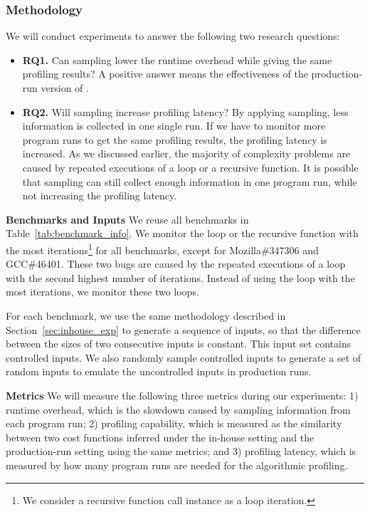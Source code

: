 \subsubsection{Methodology}
We will conduct experiments to answer the following two research questions:

\begin{itemize}
\item {\bf RQ1.} 
Can sampling lower the runtime overhead while giving the same profiling results? 
A positive answer means the effectiveness of the production-run version of \Tool. 

\item {\bf RQ2.} 
Will sampling increase profiling latency? 
By applying sampling, less information is collected in one single run. 
If we have to monitor more program runs to get the same profiling results,
the profiling latency is increased.
As we discussed earlier, the majority of complexity problems are caused 
by repeated executions of a loop or a recursive function.
It is possible that sampling can still collect enough information in one program run, 
while not increasing the profiling latency. 


\end{itemize}

\noindent\textbf{Benchmarks and Inputs}
We reuse all benchmarks in Table~\ref{tab:benchmark_info}.
We monitor the loop or the recursive function with the most iterations\footnote{We consider a recursive function call instance as a loop iteration.} 
for all benchmarks,
except for Mozilla\#347306 and GCC\#46401. 
These two bugs are caused by the repeated executions of a loop with the second
highest number of iterations. Instead of using the loop with the most iterations,
we monitor these two loops.


For each benchmark, 
we use the same methodology described in Section~\ref{sec:inhouse_exp} 
to generate a sequence of inputs, 
so that the difference between the sizes of two consecutive inputs is constant.
This input set contains controlled inputs.
We also randomly sample controlled inputs to generate a set of random 
inputs to emulate the uncontrolled inputs in production runs.    

\noindent\textbf{Metrics}
We will measure the following three metrics during our experiments:
1) runtime overhead, which is the slowdown caused 
by sampling information from each program run;
2) profiling capability, which is measured as the similarity between two cost functions 
inferred under the in-house setting and the production-run setting using the same metrics;
and 3) profiling latency, which is measured by how many program 
runs are needed for the algorithmic profiling. 


